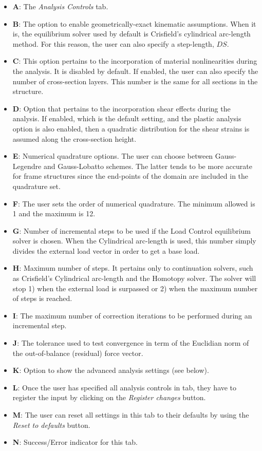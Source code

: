 \begin{appendices}
\begin{itemize}
	\item \textbf{A}: The \textit{Analysis Controls} tab.
	\item \textbf{B}: The option to enable geometrically-exact kinematic 
	assumptions. When it is, the equilibrium solver used by default is 
	Crisfield's cylindrical arc-length method. For this reason, the user can 
	also specify a step-length, $DS$. 
	\item \textbf{C}: This option pertains to the incorporation of material 
	nonlinearities during the analysis. It is disabled by default. If enabled, 
	the user can also specify the number of cross-section layers. This number 
	is the same for all sections in the structure.
	\item \textbf{D}: Option that pertains to the incorporation shear effects 
	during the analysis. If enabled, which is the default setting, and the 
	plastic analysis option is also enabled, then a quadratic distribution for 
	the shear strains is assumed along the cross-section height.
	\item \textbf{E}: Numerical quadrature options. The user can choose between 
	Gauss-Legendre and Gauss-Lobatto schemes. The latter tends to be more 
	accurate for frame structures since the end-points of the domain are 
	included in the quadrature set.
	\item \textbf{F}: The user sets the order of numerical quadrature. The 
	minimum allowed is 1 and the maximum is 12.
	\item \textbf{G}: Number of incremental steps to be used if the Load 
	Control equilibrium solver is chosen. When the Cylindrical arc-length is 
	used, this number simply divides the external load vector in order to get a 
	base load.
	\item \textbf{H}: Maximum number of steps. It pertains only to continuation 
	solvers, such as Crisfield's Cylindrical arc-length and the Homotopy 
	solver. The solver will stop 1) when the external load is surpassed or 2) 
	when the maximum number of steps is reached.
	\item \textbf{I}: The maximum number of correction iterations to be 
	performed during an incremental step.
	\item \textbf{J}: The tolerance used to test convergence in term of the 
	Euclidian norm of the out-of-balance (residual) force vector.
	\item \textbf{K}: Option to show the advanced analysis settings (see below).
	\item \textbf{L}: Once the user has specified all analysis controls in tab, 
	they have to register the input by clicking on the \textit{Register 
		changes} button.
	\item \textbf{M}: The user can reset all settings in this tab to their 
	defaults by using the \textit{Reset to defaults} button.
	\item \textbf{N}: Success/Error indicator for this tab.
\end{itemize}


\end{appendices}

